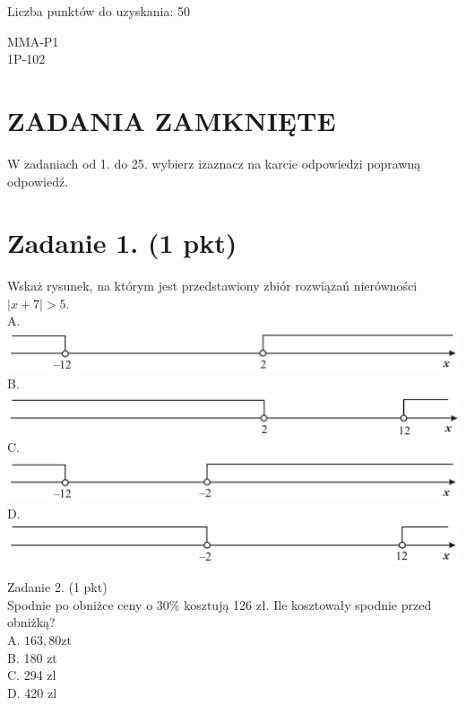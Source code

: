 \documentclass[10pt]{article}
\begin{document}
Liczba punktów do uzyskania: 50

MMA-P1\\
1P-102

\section*{ZADANIA ZAMKNIĘTE}
W zadaniach od 1. do 25. wybierz izaznacz na karcie odpowiedzi poprawną odpowiedź.

\section*{Zadanie 1. (1 pkt)}
Wskaż rysunek, na którym jest przedstawiony zbiór rozwiązań nierówności \(|x+7|>5\).\\
A.\\
\includegraphics[max width=\textwidth, center]{2024_11_21_caf6b2e64dd65c9b24eeg-02}\\
B.\\
\includegraphics[max width=\textwidth, center]{2024_11_21_caf6b2e64dd65c9b24eeg-02(2)}\\
C.\\
\includegraphics[max width=\textwidth, center]{2024_11_21_caf6b2e64dd65c9b24eeg-02(3)}\\
D.\\
\includegraphics[max width=\textwidth, center]{2024_11_21_caf6b2e64dd65c9b24eeg-02(1)}

Zadanie 2. (1 pkt)\\
Spodnie po obniżce ceny o \(30 \%\) kosztują 126 zł. Ile kosztowały spodnie przed obniżką?\\
A. \(163,80 \mathrm{zt}\)\\
B. 180 zt\\
C. 294 zl\\
D. 420 zl
\end{document}
